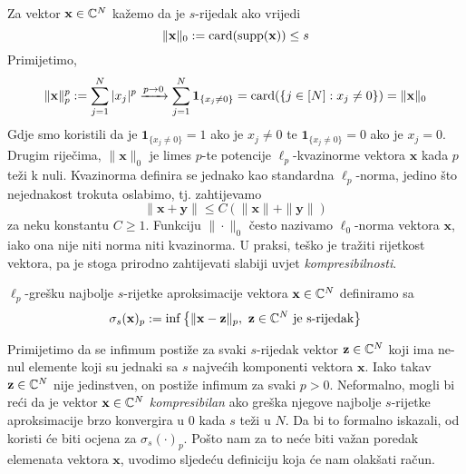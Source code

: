 \documentclass[a4paper,twoside,12pt]{memoir} %
\newcommand{\vect}[1]{\mathbf{#1}}
\renewcommand{\vec}{\vect}
\newcommand{\card}{\text{\normalfont{card}}}
\newcommand{\supp}{\text{\normalfont{supp}}}
\begin{document}
\noindent Za vektor $\vec{x}\in\C^{N}$ ka\v{z}emo da je $s$-rijedak ako vrijedi $$\|\vec{x}\|_0 := \card(\supp(\vec{x})) \leq s$$
Primijetimo,
$$\|\vec{x}\|_p^p := \sum_{j=1}^N|x_j|^p \xrightarrow{p\rightarrow 0} \sum_{j=1}^N\mathbf{1}_{\{x_j \neq 0\}} = \card(\{j \in [N]:x_j \neq 0\}) = \|\vec{x}\|_0$$
Gdje smo koristili da je $\mathbf{1}_{\{x_j \neq 0\}} = 1$  ako je $x_j \neq 0$ te $\mathbf{1}_{\{x_j \neq 0\}} = 0$  ako je $x_j = 0$. Drugim rije\v{c}ima, $\|\vec{x}\|_0$ je limes $p$-te potencije $\ell_p$-kvazinorme vektora $\vec{x}$ kada $p$ te\v{z}i k nuli. Kvazinorma definira se jednako kao standardna $\ell_p$-norma, jedino \v{s}to nejednakost trokuta oslabimo, tj. zahtijevamo
$$\|\vec{x}+\vec{y}\|\leq C(\|\vec{x}\|+\|\vec{y}\|)$$ 
za neku konstantu $C \geq 1$.
Funkciju $\|\cdot\|_0$ \v{c}esto nazivamo $\ell_0$-norma vektora $\vec x$, iako  ona nije niti norma niti kvazinorma. U praksi, te\v{s}ko je tra\v{z}iti rijetkost vektora, pa je stoga prirodno zahtijevati slabiji uvjet \textit{kompresibilnosti}.  
\begin{defn}\label{greska_naj_s_aprox}
    $\ell_p$-gre\v{s}ku najbolje $s$-rijetke aproksimacije vektora $\vec{x}\in\C^{N}$ definiramo sa 
    $$\sigma_s(\vec{x})_p := \inf\big\{\|\vec{x}-\vec{z}\|_p,\ \vec{z} \in \C^{N} \ \text{je s-rijedak}\big\}$$
\end{defn}
\indent Primijetimo da se infimum posti\v{z}e za svaki $s$-rijedak vektor $\vec{z} \in \C^{N}$ koji ima ne-nul elemente koji su jednaki sa $s$ najve\'cih komponenti vektora $\vec{x}$. Iako takav $\vec{z} \in \C^{N}$ nije jedinstven, on posti\v{z}e infimum za svaki $p > 0$. Neformalno, mogli bi re\'ci da je vektor $\vec{x} \in \C^{N}$ \textit{kompresibilan} ako gre\v{s}ka njegove najbolje $s$-rijetke aproksimacije brzo konvergira u $0$ kada $s$ te\v{z}i u $N$. Da bi to formalno iskazali, od koristi \'ce biti ocjena za $\sigma_s(\cdot)_p$. Po\v{s}to nam za to ne\'ce biti va\v{z}an poredak elemenata vektora $\vec{x}$, uvodimo sljede\'cu definiciju koja \'ce nam olak\v{s}ati ra\v{c}un.
\end{document}
